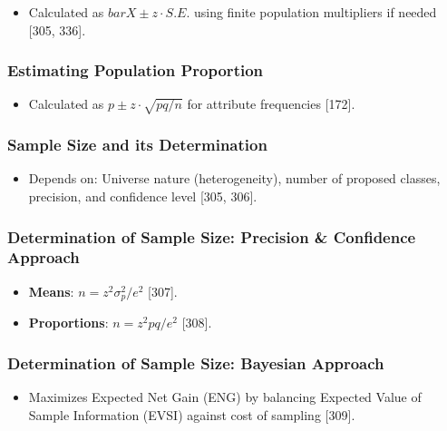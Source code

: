 \documentclass[
]{article}
\providecommand{\tightlist}{%
  \setlength{\itemsep}{0pt}\setlength{\parskip}{0pt}}
\begin{document}
\begin{itemize}
\tightlist
\item
  Calculated as \(bar{X} \pm z \cdot S.E.\) using finite population
  multipliers if needed {[}305, 336{]}.
\end{itemize}

\subsubsection{Estimating Population
Proportion}\label{estimating-population-proportion}

\begin{itemize}
\tightlist
\item
  Calculated as \(p \pm z \cdot \sqrt{pq/n}\) for attribute frequencies
  {[}172{]}.
\end{itemize}

\subsubsection{Sample Size and its
Determination}\label{sample-size-and-its-determination}

\begin{itemize}
\tightlist
\item
  Depends on: Universe nature (heterogeneity), number of proposed
  classes, precision, and confidence level {[}305, 306{]}.
\end{itemize}

\subsubsection{Determination of Sample Size: Precision \& Confidence
Approach}\label{determination-of-sample-size-precision-confidence-approach}

\begin{itemize}
\tightlist
\item
  \textbf{Means}: \(n = z^2 \sigma_p^2 / e^2\) {[}307{]}.
\item
  \textbf{Proportions}: \(n = z^2 p q / e^2\) {[}308{]}.
\end{itemize}

\subsubsection{Determination of Sample Size: Bayesian
Approach}\label{determination-of-sample-size-bayesian-approach}

\begin{itemize}
\tightlist
\item
  Maximizes Expected Net Gain (ENG) by balancing Expected Value of
  Sample Information (EVSI) against cost of sampling {[}309{]}.
\end{itemize}
\end{document}
